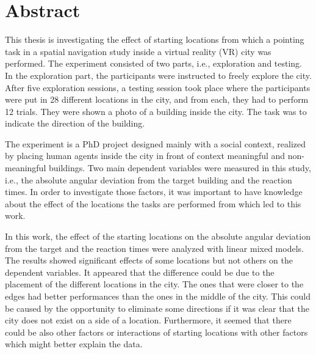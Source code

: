 \chapter*{Abstract}\label{cha:abstract}


This thesis is investigating the effect of starting locations from which a pointing task in a spatial navigation study inside a virtual reality (VR) city was performed. The experiment consisted of two parts, i.e., exploration and testing. In the exploration part, the participants were instructed to freely explore the city. After five exploration sessions, a testing session took place where the participants were put in 28 different locations in the city, and from each, they had to perform 12 trials. They were shown a photo of a building inside the city. The task was to indicate the direction of the building.

The experiment is a PhD project designed mainly with a social context, realized by placing human agents inside the city in front of context meaningful and non-meaningful buildings. Two main dependent variables were measured in this study, i.e., the absolute angular deviation from the target building and the reaction times. In order to investigate those factors, it was important to have knowledge about the effect of the locations the tasks are performed from which led to this work. 

In this work, the effect of the starting locations on the absolute angular deviation from the target and the reaction times were analyzed with linear mixed models. The results showed significant effects of some locations but not others on the dependent variables. It appeared that the difference could be due to the placement of the different locations in the city. The ones that were closer to the edges had better performances than the ones in the middle of the city. This could be caused by the opportunity to eliminate some directions if it was clear that the city does not exist on a side of a location. Furthermore, it seemed that there could be also other factors or interactions of starting locations with other factors which might better explain the data.